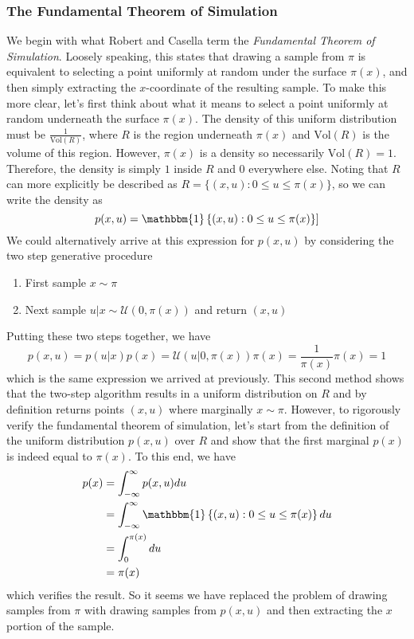 \documentclass[12pt]{article}
\begin{document}
 \subsubsection{The Fundamental Theorem of Simulation}
 We begin with what Robert and Casella term the \textit{Fundamental Theorem of Simulation}. Loosely speaking, this states that drawing a sample from $\pi$ is equivalent to selecting a point
 uniformly at random under the surface $\pi(x)$, and then simply extracting the $x$-coordinate of the resulting sample. To make this more clear, let's first think about what it means to select a point
 uniformly at random underneath the surface $\pi(x)$. The density of this uniform distribution must be $\frac{1}{\text{Vol}(R)}$, where $R$ is the region underneath $\pi(x)$ and $\text{Vol}(R)$ is the 
 volume of this region. However, $\pi(x)$ is a density so necessarily $\text{Vol}(R) = 1$. Therefore, the density is simply $1$ inside $R$ and $0$ everywhere else. Noting that $R$ can more explicitly 
 be described as $R = \{(x, u): 0 \leq u \leq \pi(x)\}$, so we can write the density as 
 \[p(x, u) = \mathbbm{1}\left\{(x, u): 0 \leq u \leq \pi(x)\right\}]\]
We could alternatively arrive at this expression for $p(x, u)$ by considering the two step generative procedure
\begin{enumerate}
\item First sample $x \sim \pi$
\item Next sample $u|x \sim \mathcal{U}(0, \pi(x))$ and return $(x, u)$
\end{enumerate}
Putting these two steps together, we have 
\[p(x, u) = p(u|x)p(x) = \mathcal{U}(u|0, \pi(x))\pi(x) = \frac{1}{\pi(x)}\pi(x) = 1\]
which is the same expression we arrived at previously. This second method shows that the two-step algorithm results in a uniform distribution on $R$ and by definition returns
points $(x, u)$ where marginally $x \sim \pi$. However, to rigorously verify the fundamental theorem of simulation, let's start from the definition of the uniform distribution $p(x, u)$ 
over $R$ and show that the first marginal $p(x)$ is indeed equal to $\pi(x)$. To this end, we have
\begin{align*}
p(x) &= \int_{-\infty}^{\infty} p(x, u) du \\
       &= \int_{-\infty}^{\infty} \mathbbm{1}\left\{(x, u): 0 \leq u \leq \pi(x)\right\} du \\
       &= \int_{0}^{\pi(x)} du \\
       &= \pi(x)
\end{align*}
which verifies the result. So it seems we have replaced the problem of drawing samples from $\pi$ with drawing samples from $p(x, u)$ and then extracting the $x$ portion of the sample. 
\end{document}

